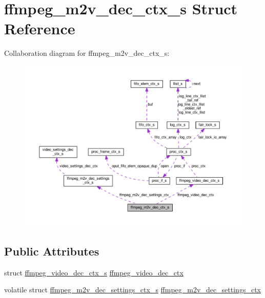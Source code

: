 \hypertarget{structffmpeg__m2v__dec__ctx__s}{}\section{ffmpeg\+\_\+m2v\+\_\+dec\+\_\+ctx\+\_\+s Struct Reference}
\label{structffmpeg__m2v__dec__ctx__s}


Collaboration diagram for ffmpeg\+\_\+m2v\+\_\+dec\+\_\+ctx\+\_\+s\+:\nopagebreak
\begin{figure}[H]
\begin{center}
\leavevmode
\includegraphics[width=350pt]{structffmpeg__m2v__dec__ctx__s__coll__graph}
\end{center}
\end{figure}
\subsection*{Public Attributes}
\begin{DoxyCompactItemize}
\item 
struct \hyperlink{structffmpeg__video__dec__ctx__s}{ffmpeg\+\_\+video\+\_\+dec\+\_\+ctx\+\_\+s} \hyperlink{structffmpeg__m2v__dec__ctx__s_ae526e60014d99bffe3c4e97b14352dcc}{ffmpeg\+\_\+video\+\_\+dec\+\_\+ctx}
\item 
volatile struct \hyperlink{structffmpeg__m2v__dec__settings__ctx__s}{ffmpeg\+\_\+m2v\+\_\+dec\+\_\+settings\+\_\+ctx\+\_\+s} \hyperlink{structffmpeg__m2v__dec__ctx__s_a58531cef90c2ecba9e0bdf167d9929e3}{ffmpeg\+\_\+m2v\+\_\+dec\+\_\+settings\+\_\+ctx}
\end{DoxyCompactItemize}



